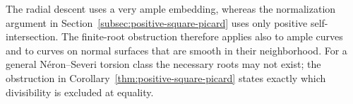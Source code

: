 The radial descent uses a very ample embedding, whereas the
normalization argument in Section~\ref{subsec:positive-square-picard}
uses only positive self-intersection. The finite-root obstruction
therefore applies also to ample curves and to curves on normal
surfaces that are smooth in their neighborhood. For a general
N\'eron--Severi torsion class the necessary roots may not exist;
the obstruction in Corollary~\ref{thm:positive-square-picard}
states exactly which divisibility is excluded at equality.
